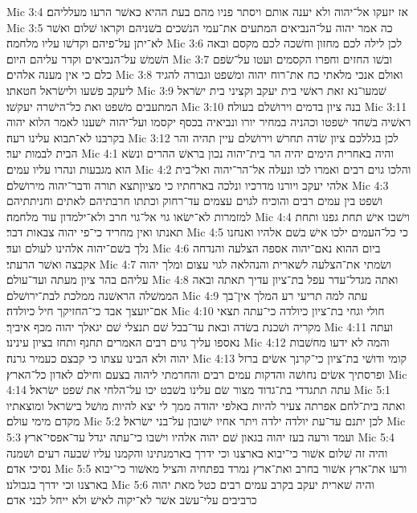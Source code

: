 Mic 3:4  אז יזעקו אל־יהוה ולא יענה אותם ויסתר פניו מהם בעת ההיא כאשׁר הרעו מעלליהם׃
Mic 3:5  כה אמר יהוה על־הנביאים המתעים את־עמי הנשׁכים בשׁניהם וקראו שׁלום ואשׁר לא־יתן על־פיהם וקדשׁו עליו מלחמה׃
Mic 3:6  לכן לילה לכם מחזון וחשׁכה לכם מקסם ובאה השׁמשׁ על־הנביאים וקדר עליהם היום׃
Mic 3:7  ובשׁו החזים וחפרו הקסמים ועטו על־שׂפם כלם כי אין מענה אלהים׃
Mic 3:8  ואולם אנכי מלאתי כח את־רוח יהוה ומשׁפט וגבורה להגיד ליעקב פשׁעו ולישׂראל חטאתו׃
Mic 3:9  שׁמעו־נא זאת ראשׁי בית יעקב וקציני בית ישׂראל המתעבים משׁפט ואת כל־הישׁרה יעקשׁו׃
Mic 3:10  בנה ציון בדמים וירושׁלם בעולה׃
Mic 3:11  ראשׁיה בשׁחד ישׁפטו וכהניה במחיר יורו ונביאיה בכסף יקסמו ועל־יהוה ישׁענו לאמר הלוא יהוה בקרבנו לא־תבוא עלינו רעה׃
Mic 3:12  לכן בגללכם ציון שׂדה תחרשׁ וירושׁלם עיין תהיה והר הבית לבמות יער׃
Mic 4:1  והיה באחרית הימים יהיה הר בית־יהוה נכון בראשׁ ההרים ונשׂא הוא מגבעות ונהרו עליו עמים׃
Mic 4:2  והלכו גוים רבים ואמרו לכו ונעלה אל־הר־יהוה ואל־בית אלהי יעקב ויורנו מדרכיו ונלכה בארחתיו כי מציוןתצא תורה ודבר־יהוה מירושׁלם׃
Mic 4:3  ושׁפט בין עמים רבים והוכיח לגוים עצמים עד־רחוק וכתתו חרבתיהם לאתים וחניתתיהם למזמרות לא־ישׂאו גוי אל־גוי חרב ולא־ילמדון עוד מלחמה׃
Mic 4:4  וישׁבו אישׁ תחת גפנו ותחת תאנתו ואין מחריד כי־פי יהוה צבאות דבר׃
Mic 4:5  כי כל־העמים ילכו אישׁ בשׁם אלהיו ואנחנו נלך בשׁם־יהוה אלהינו לעולם ועד׃
Mic 4:6  ביום ההוא נאם־יהוה אספה הצלעה והנדחה אקבצה ואשׁר הרעתי׃
Mic 4:7  ושׂמתי את־הצלעה לשׁארית והנהלאה לגוי עצום ומלך יהוה עליהם בהר ציון מעתה ועד־עולם׃
Mic 4:8  ואתה מגדל־עדר עפל בת־ציון עדיך תאתה ובאה הממשׁלה הראשׁנה ממלכת לבת־ירושׁלם׃
Mic 4:9  עתה למה תריעי רע המלך אין־בך אם־יועצך אבד כי־החזיקך חיל כיולדה׃
Mic 4:10  חולי וגחי בת־ציון כיולדה כי־עתה תצאי מקריה ושׁכנת בשׂדה ובאת עד־בבל שׁם תנצלי שׁם יגאלך יהוה מכף איביך׃
Mic 4:11  ועתה נאספו עליך גוים רבים האמרים תחנף ותחז בציון עינינו׃
Mic 4:12  והמה לא ידעו מחשׁבות יהוה ולא הבינו עצתו כי קבצם כעמיר גרנה׃
Mic 4:13  קומי ודושׁי בת־ציון כי־קרנך אשׂים ברזל ופרסתיך אשׂים נחושׁה והדקות עמים רבים והחרמתי ליהוה בצעם וחילם לאדון כל־הארץ׃
Mic 4:14  עתה תתגדדי בת־גדוד מצור שׂם עלינו בשׁבט יכו על־הלחי את שׁפט ישׂראל׃
Mic 5:1  ואתה בית־לחם אפרתה צעיר להיות באלפי יהודה ממך לי יצא להיות מושׁל בישׂראל ומוצאתיו מקדם מימי עולם׃
Mic 5:2  לכן יתנם עד־עת יולדה ילדה ויתר אחיו ישׁובון על־בני ישׂראל׃
Mic 5:3  ועמד ורעה בעז יהוה בגאון שׁם יהוה אלהיו וישׁבו כי־עתה יגדל עד־אפסי־ארץ׃
Mic 5:4  והיה זה שׁלום אשׁור כי־יבוא בארצנו וכי ידרך בארמנתינו והקמנו עליו שׁבעה רעים ושׁמנה נסיכי אדם׃
Mic 5:5  ורעו את־ארץ אשׁור בחרב ואת־ארץ נמרד בפתחיה והציל מאשׁור כי־יבוא בארצנו וכי ידרך בגבולנו׃
Mic 5:6  והיה שׁארית יעקב בקרב עמים רבים כטל מאת יהוה כרביבים עלי־עשׂב אשׁר לא־יקוה לאישׁ ולא ייחל לבני אדם׃
